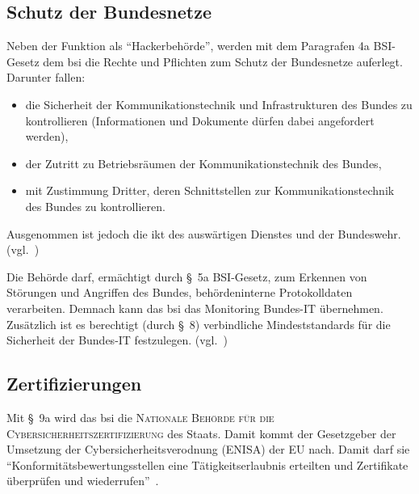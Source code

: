 \subsection{Schutz der Bundesnetze}\label{ssec:schutz-der-bundesnetze}
Neben der Funktion als \enquote{Hackerbehörde},
werden mit dem Paragrafen 4a BSI-Gesetz dem \acrshort{bsi} die Rechte und Pflichten zum Schutz der Bundesnetze auferlegt.
Darunter fallen:
\begin{itemize}
    \item die Sicherheit der Kommunikationstechnik und Infrastrukturen des Bundes zu kontrollieren
    (Informationen und Dokumente dürfen dabei angefordert werden),
    \item der Zutritt zu Betriebsräumen der Kommunikationstechnik des Bundes,
    \item mit Zustimmung Dritter, deren Schnittstellen zur Kommunikationstechnik des Bundes zu kontrollieren.
\end{itemize}
Ausgenommen ist jedoch die \acrshort{ikt} des auswärtigen Dienstes und der Bundeswehr.
(vgl.~\cite{neue-it-sig-2.0})

Die Behörde darf, ermächtigt durch §~5a BSI-Gesetz, zum Erkennen von Störungen und Angriffen des Bundes,
behördeninterne Protokolldaten verarbeiten.
Demnach kann das \acrshort{bsi} das Monitoring Bundes-IT übernehmen.
Zusätzlich ist es berechtigt (durch §~8) verbindliche Mindeststandards für die Sicherheit der Bundes-IT festzulegen.
(vgl.~\cite{neue-it-sig-2.0})

\subsection{Zertifizierungen}\label{ssec:zertifizierungen}
Mit §~9a wird das \acrshort{bsi} die \textsc{Nationale Behörde für die Cybersicherheitszertifizierung} des Staats.
Damit kommt der Gesetzgeber der Umsetzung der Cybersicherheitsverodnung (ENISA) der EU nach.
Damit darf sie \enquote{Konformitätsbewertungsstellen eine Tätigkeitserlaubnis erteilten und Zertifikate überprüfen und wiederrufen}~\cite{neue-it-sig-2.0}.

